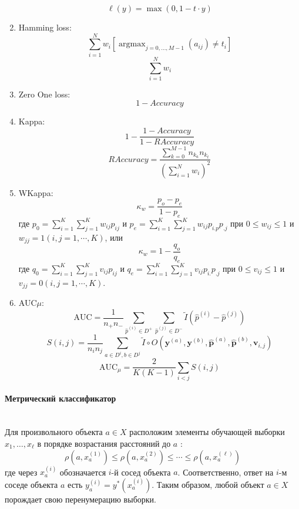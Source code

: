 \begin{enumerate}
            $$
            \ell(y)=\max (0,1-t \cdot y)
            $$
            \item Hamming loss:
            $$
            \sum_{i=1}^{N} w_{i}\left[\operatorname{argmax}_{j=0, \ldots, M-1}\left(a_{i j}\right) \neq t_{i}\right]
            $$
            $$
            \sum_{i=1}^{N} w_{i}
            $$
            \item Zero One loss:
            $$1 - Accuracy$$
            \item Kappa:
            $$
            1-\frac{1-Accuracy }{1-RAccuracy }
            $$
$$RAccuracy =\frac{\sum_{k=0}^{M-1} n_{k_{a}} n_{k_{t}}}{\left(\sum_{i=1}^{N} w_{i}\right)^{2}}
$$
            \item WKappa:
            $$
\kappa_{w}=\frac{p_{o}-p_{e}}{1-p_{e}}
$$
где $p_{0}=\sum_{i=1}^{K} \sum_{j=1}^{K} w_{i j} p_{i j}$ и $p_{e}=\sum_{i=1}^{K} \sum_{j=1}^{K} w_{i j} p_{i . p} p_{. j}$ при $0 \leq w_{i j} \leq 1$ и $w_{j j}=1(i, j=1, \cdots, K)$, или
$$
\kappa_{w}=1-\frac{q_{o}}{q_{e}}
$$
где $q_{0}=\sum_{i=1}^{K} \sum_{j=1}^{K} v_{i j} p_{i j}$ и  $q_{e}=\sum_{i=1}^{K} \sum_{j=1}^{K} v_{i j} p_{i .} p_{. j}$ при $0 \leq v_{i j} \leq 1$ и $v_{j j}=0(i, j=1, \cdots, K)$. 
            \item AUC$\mu$:
            $$\mathrm{AUC}=\frac{1}{n_{+} n_{-}} \sum_{\hat{p}^{(i)} \in D^{+}} \sum_{\hat{p}^{(j)} \in D^{-}} \tilde{I}\left(\hat{p}^{(i)}-\hat{p}^{(j)}\right)$$
            $$S(i, j)=\frac{1}{n_{i} n_{j}} \sum_{a \in D^{i}, b \in D^{j}} \tilde{I} \circ O\left(\mathbf{y}^{(a)}, \mathbf{y}^{(b)}, \hat{\mathbf{p}}^{(a)}, \hat{\mathbf{p}}^{(b)}, \mathbf{v}_{i, j}\right)$$
            $$\mathrm{AUC}_{\mu}=\frac{2}{K(K-1)} \sum_{i<j} S(i, j)$$
        \end{enumerate}
        
        \newpage
        \paragraph
        {
        Метрический классификатор
        }
        \noindent\\
        
        \noindent
        Для произвольного объекта $a \in X$ расположим элементы обучающей выборки $x_{1}, \ldots, x_{\ell}$ в порядке возрастания расстояний до $a$ :
$$
\rho\left(a, x_{a}^{(1)}\right) \leqslant \rho\left(a, x_{a}^{(2)}\right) \leqslant \cdots \leqslant \rho\left(a, x_{a}^{(\ell)}\right)
$$
где через $x_{a}^{(i)}$ обозначается $i$-й сосед объекта $a$. Соответственно, ответ на $i$-м соседе объекта $a$ есть $y_{a}^{(i)}=y^{*}\left(x_{a}^{(i)}\right)$. Таким образом, любой объект $a \in X$ порождает свою перенумерацию выборки.

